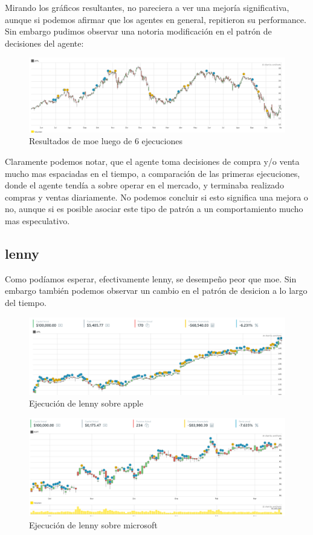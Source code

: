 Mirando los gráficos resultantes, no pareciera a ver una mejoría significativa, aunque si podemos afirmar que los agentes en general, repitieron su performance. Sin embargo pudimos observar una notoria modificación en el patrón de decisiones del agente:

\begin{figure}[h!]
	\includegraphics[scale=0.4]{imagenes/moe_appl_ex6_1.png}
	\caption{Resultados de moe luego de 6 ejecuciones}
\end{figure}

Claramente podemos notar, que el agente toma decisiones de compra y/o venta mucho mas espaciadas en el tiempo, a comparación de las primeras ejecuciones, donde el agente tendía a sobre operar en el mercado, y terminaba realizado compras y ventas diariamente. No podemos concluir si esto significa una mejora o no, aunque si es posible asociar este tipo de patrón a un comportamiento mucho mas especulativo.

\subsection{lenny}

Como podíamos esperar, efectivamente lenny, se desempeño peor que moe.
Sin embargo también podemos observar un cambio en el patrón de desicion a lo largo del tiempo.

\begin{figure}[h!]
	\includegraphics[scale=0.5]{imagenes/lenny_appl_ex1_1.png}
	\caption{Ejecución de lenny sobre apple}
\end{figure}

\begin{figure}[h!]
	\includegraphics[scale=0.5]{imagenes/lenny_msft_ex1_1.png}
	\caption{Ejecución de lenny sobre microsoft}
\end{figure}


